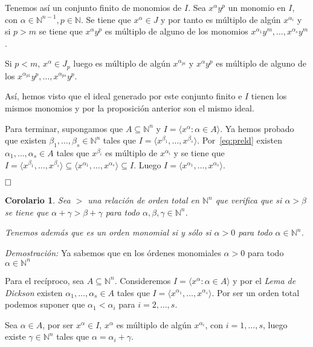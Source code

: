 \documentclass[12pt]{article}
\newtheorem{corolario}{Corolario}[theorem]
\begin{document}
Tenemos así un conjunto finito de monomios de $I$. Sea $x^\alpha y^p$ un monomio en $I$, con $\alpha \in \mathbb{N}^{n-1}, p \in \mathbb{N}$. Se tiene que $x^\alpha \in J$ y por tanto es múltiplo de algún $x^{\alpha_i}$ y si $p>m$ se tiene que $x^\alpha y^p$ es múltiplo de alguno de los monomios $x^{\alpha_1}y^m, \ldots, x^{\alpha_s}y^m$.

Si $p<m$, $x^\alpha \in J_p$ luego es múltiplo de algún $x^{\alpha_{pi}}$ y $x^\alpha y^p$ es múltiplo de alguno de los $x^{\alpha_{p1}}y^p, \ldots, x^{\alpha_{ps}}y^p$.

Así, hemos visto que el ideal generado por este conjunto finito e $I$ tienen los mismos monomios y por la proposición anterior son el mismo ideal.

Para terminar, supongamos que $A \subseteq \mathbb{N}^n$ y $I= \langle x^\alpha : \alpha \in A \rangle$. Ya hemos probado que existen $ \beta_1, \ldots, \beta_s \in \mathbb{N}^n$ tales que $I = \langle x^{\beta_1}, \ldots, x^{\beta_s} \rangle$. Por~\ref{eq:preld} existen $\alpha_1, \ldots, \alpha_s \in A$ tales que $x^{\beta_i}$ es múltiplo de $x^{\alpha_i}$ y se tiene que $I = \langle x^{\beta_1}, \ldots, x^{\beta_s} \rangle \subseteq \langle x^{\alpha_1}, \ldots, x^{\alpha_s} \rangle \subseteq I$. Luego $I = \langle x^{\alpha_1}, \ldots, x^{\alpha_s} \rangle$.

$\hfill \square$

\begin{corolario} Sea $>$ una relación de orden total en $\mathbb{N}^n$ que verifica que si $\alpha > \beta$ se tiene que $\alpha + \gamma > \beta + \gamma$ para todo $\alpha, \beta, \gamma \in \mathbb{N}^n$.

Tenemos además que es un orden monomial si y sólo si $\alpha > 0$ para todo $\alpha \in \mathbb{N}^n$.
\end{corolario}

\emph{Demostración: }Ya sabemos que en los órdenes monomiales $\alpha >0$ para todo $\alpha \in \mathbb{N}^n$

Para el recíproco, sea $A \subseteq \mathbb{N}^n$. Consideremos $I = \langle x^\alpha : \alpha \in A \rangle$ y por el \textit{Lema de Dickson} existen $\alpha_1, \ldots, \alpha_s \in A$ tales que $I = \langle x^{\alpha_1}, \ldots, x^{\alpha_s} \rangle$. Por ser un orden total podemos suponer que $\alpha_1 < \alpha_i$ para $i = 2, \ldots, s$.

Sea $\alpha \in A$, por ser $x^\alpha \in I$, $x^\alpha$ es múltiplo de algún $x^{\alpha_i}$, con $i = 1, \ldots, s$, luego existe $\gamma \in \mathbb{N}^n$ tales que $\alpha = \alpha_i + \gamma$. 
\end{document}
